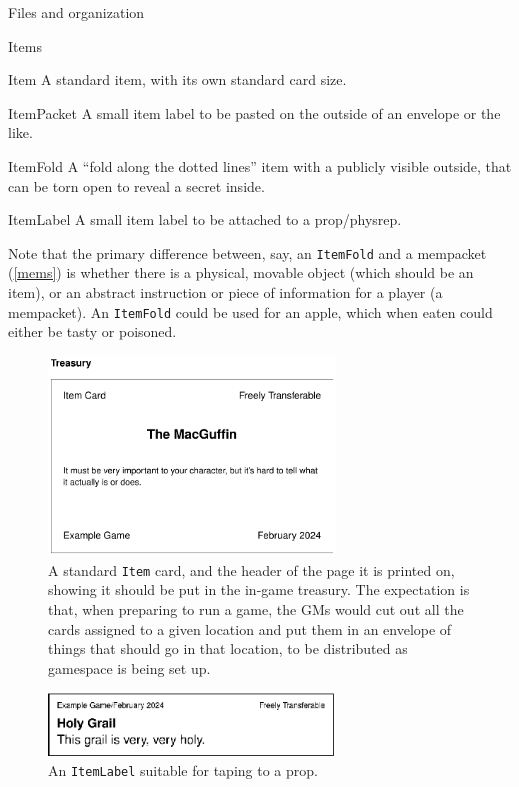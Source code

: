 \documentclass[sheet]{GameTexBase}
\begin{document}
\begin{section}{Files and organization}
\begin{subsection}{Items}
\begin{desc}
\item[Item] A standard item, with its own standard card size.
\item[ItemPacket] A small item label to be pasted on the outside of an envelope or the like.
\item[ItemFold] A ``fold along the dotted lines'' item with a publicly visible outside, that can be torn open to reveal a secret inside.
\item[ItemLabel] A small item label to be attached to a prop/physrep.
\end{desc}

Note that the primary difference between, say, an \lstinline|ItemFold| and a mempacket (\ref{mems}) is whether there is a physical, movable object (which should be an item), or an abstract instruction or piece of information for a player (a mempacket).  An \lstinline|ItemFold| could be used for an apple, which when eaten could either be tasty or poisoned.
\begin{figure}
\centering
\includegraphics[width=3in]{item-card}
\caption{A standard \lstinline|Item| card, and the header of the page it is printed on, showing it should be put in the in-game treasury.  The expectation is that, when preparing to run a game, the GMs would cut out all the cards assigned to a given location and put them in an envelope of things that should go in that location, to be distributed as gamespace is being set up.
}
\label{itemcardfig}
\end{figure}\begin{figure}
\centering
\includegraphics[width=3in]{item-label}
\caption{An \lstinline|ItemLabel| suitable for taping to a prop.}
\end{figure}
\begin{figure}

\end{figure}
\end{subsection}
\end{section}
\end{document}
